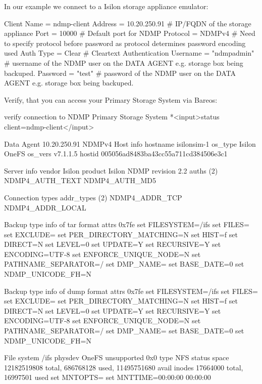 In our example we connect to a Isilon storage appliance emulator:
\begin{bconfig}{}
Client {
  Name = ndmp-client
  Address = 10.20.250.91  # IP/FQDN of the storage appliance
  Port = 10000            # Default port for NDMP
  Protocol = NDMPv4       # Need to specify protocol before password as protocol determines password encoding used
  Auth Type = Clear       # Cleartext Authentication
  Username = "ndmpadmin"  # username of the NDMP user on the DATA AGENT e.g. storage box being backuped.
  Password = "test"       # password of the NDMP user on the DATA AGENT e.g. storage box being backuped.
}
\end{bconfig}

Verify, that you can access your Primary Storage System via Bareos:

\begin{bconsole}{verify connection to NDMP Primary Storage System}
*<input>status client=ndmp-client</input>

Data Agent 10.20.250.91 NDMPv4
  Host info
    hostname   isilonsim-1
    os_type    Isilon OneFS
    os_vers    v7.1.1.5
    hostid     005056ad8483ba43cc55a711cd384506e3c1

  Server info
    vendor     Isilon
    product    Isilon NDMP
    revision   2.2
    auths      (2) NDMP4_AUTH_TEXT NDMP4_AUTH_MD5

  Connection types
    addr_types (2) NDMP4_ADDR_TCP NDMP4_ADDR_LOCAL

  Backup type info of tar format
    attrs      0x7fe
    set        FILESYSTEM=/ifs
    set        FILES=
    set        EXCLUDE=
    set        PER_DIRECTORY_MATCHING=N
    set        HIST=f
    set        DIRECT=N
    set        LEVEL=0
    set        UPDATE=Y
    set        RECURSIVE=Y
    set        ENCODING=UTF-8
    set        ENFORCE_UNIQUE_NODE=N
    set        PATHNAME_SEPARATOR=/
    set        DMP_NAME=
    set        BASE_DATE=0
    set        NDMP_UNICODE_FH=N

  Backup type info of dump format
    attrs      0x7fe
    set        FILESYSTEM=/ifs
    set        FILES=
    set        EXCLUDE=
    set        PER_DIRECTORY_MATCHING=N
    set        HIST=f
    set        DIRECT=N
    set        LEVEL=0
    set        UPDATE=Y
    set        RECURSIVE=Y
    set        ENCODING=UTF-8
    set        ENFORCE_UNIQUE_NODE=N
    set        PATHNAME_SEPARATOR=/
    set        DMP_NAME=
    set        BASE_DATE=0
    set        NDMP_UNICODE_FH=N

  File system /ifs
    physdev    OneFS
    unsupported 0x0
    type       NFS
    status
    space      12182519808 total, 686768128 used, 11495751680 avail
    inodes     17664000 total, 16997501 used
    set        MNTOPTS=
    set        MNTTIME=00:00:00 00:00:00
\end{bconsole}

